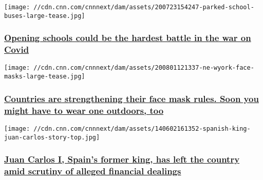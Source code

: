 \href{/2020/08/04/europe/why-cant-americans-go-back-to-school-analysis-intl/index.html}{}

\texttt{[image: //cdn.cnn.com/cnnnext/dam/assets/200723154247-parked-school-buses-large-tease.jpg]}

\hypertarget{opening-schools-could-be-the-hardest-battle-in-the-war-on-covid}{%
\subsubsection{\texorpdfstring{\href{/2020/08/04/europe/why-cant-americans-go-back-to-school-analysis-intl/index.html}{Opening
schools could be the hardest battle in the war on
Covid}}{Opening schools could be the hardest battle in the war on Covid}}\label{opening-schools-could-be-the-hardest-battle-in-the-war-on-covid}}

\href{/2020/08/04/europe/face-masks-outdoors-rules-intl/index.html}{}

\texttt{[image: //cdn.cnn.com/cnnnext/dam/assets/200801121337-ne-wyork-face-masks-large-tease.jpg]}

\hypertarget{countries-are-strengthening-their-face-mask-rules-soon-you-might-have-to-wear-one-outdoors-too}{%
\subsubsection{\texorpdfstring{\href{/2020/08/04/europe/face-masks-outdoors-rules-intl/index.html}{Countries
are strengthening their face mask rules. Soon you might have to wear one
outdoors,
too}}{Countries are strengthening their face mask rules. Soon you might have to wear one outdoors, too}}\label{countries-are-strengthening-their-face-mask-rules-soon-you-might-have-to-wear-one-outdoors-too}}

\href{/2020/08/03/europe/juan-carlos-spain-announcement-intl/index.html}{}

\texttt{[image: //cdn.cnn.com/cnnnext/dam/assets/140602161352-spanish-king-juan-carlos-story-top.jpg]}

\hypertarget{juan-carlos-i-spains-former-king-has-left-the-country-amid-scrutiny-of-alleged-financial-dealings}{%
\subsubsection{\texorpdfstring{\href{/2020/08/03/europe/juan-carlos-spain-announcement-intl/index.html}{Juan
Carlos I, Spain's former king, has left the country amid scrutiny of
alleged financial
dealings}}{Juan Carlos I, Spain's former king, has left the country amid scrutiny of alleged financial dealings}}\label{juan-carlos-i-spains-former-king-has-left-the-country-amid-scrutiny-of-alleged-financial-dealings}}

